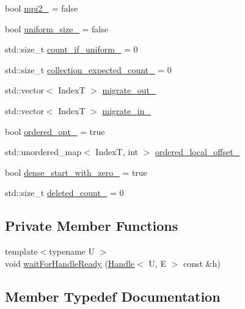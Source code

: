 \begin{DoxyCompactItemize}
\item 
bool \hyperlink{structvt_1_1rdma_1_1_sub_handle_a780ccbe4a6a728cba4a45d0d7cabe02b}{mpi2\+\_\+} = false
\item 
bool \hyperlink{structvt_1_1rdma_1_1_sub_handle_ab6c87db6739367bdbd95be5a8f673fc8}{uniform\+\_\+size\+\_\+} = false
\item 
std\+::size\+\_\+t \hyperlink{structvt_1_1rdma_1_1_sub_handle_a0e764c3fd8c4601a58ae396b2253d1fd}{count\+\_\+if\+\_\+uniform\+\_\+} = 0
\item 
std\+::size\+\_\+t \hyperlink{structvt_1_1rdma_1_1_sub_handle_a4bec3a89845f7818e60afd1bc9ad611e}{collection\+\_\+expected\+\_\+count\+\_\+} = 0
\item 
std\+::vector$<$ IndexT $>$ \hyperlink{structvt_1_1rdma_1_1_sub_handle_a13c434425c8ab69abfd202acf8979119}{migrate\+\_\+out\+\_\+}
\item 
std\+::vector$<$ IndexT $>$ \hyperlink{structvt_1_1rdma_1_1_sub_handle_a2832d6a83d0ecc36d342d33fcf5ce6dd}{migrate\+\_\+in\+\_\+}
\item 
bool \hyperlink{structvt_1_1rdma_1_1_sub_handle_a3675b46b618cd10df2ba80df3c084717}{ordered\+\_\+opt\+\_\+} = true
\item 
std\+::unordered\+\_\+map$<$ IndexT, int $>$ \hyperlink{structvt_1_1rdma_1_1_sub_handle_a384d5a4c7b19a6bfd9546769d7da1e85}{ordered\+\_\+local\+\_\+offset\+\_\+}
\item 
bool \hyperlink{structvt_1_1rdma_1_1_sub_handle_a21a1dd0a0dda531cb1153d58c5bad18b}{dense\+\_\+start\+\_\+with\+\_\+zero\+\_\+} = true
\item 
std\+::size\+\_\+t \hyperlink{structvt_1_1rdma_1_1_sub_handle_af2147cd68e8f323bad1e63c83f529bfe}{deleted\+\_\+count\+\_\+} = 0
\end{DoxyCompactItemize}
\subsection*{Private Member Functions}
\begin{DoxyCompactItemize}
\item 
{\footnotesize template$<$typename U $>$ }\\void \hyperlink{structvt_1_1rdma_1_1_sub_handle_a57898faf652b288e75811c7c38e94dc2}{wait\+For\+Handle\+Ready} (\hyperlink{structvt_1_1rdma_1_1_handle}{Handle}$<$ U, E $>$ const \&h)
\end{DoxyCompactItemize}


\subsection{Member Typedef Documentation}
\mbox{\label{structvt_1_1rdma_1_1_sub_handle_a782bd6ddc85c6a81d7f55d207fad71cd}} 
